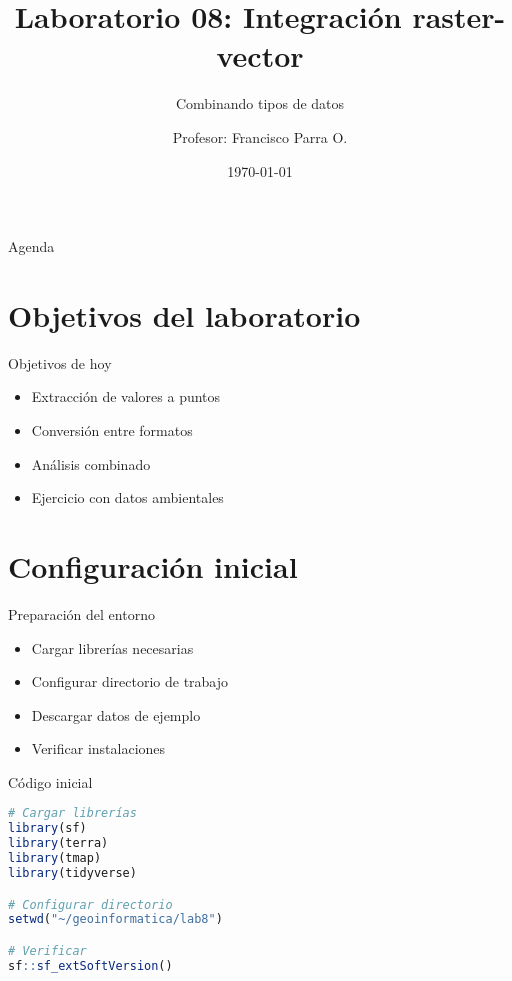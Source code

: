 \documentclass[10pt]{beamer}
\title{Laboratorio 08: Integración raster-vector}
\subtitle{Combinando tipos de datos}
\author{Profesor: Francisco Parra O.}
\institute{USACH - Ingeniería Civil en Informática}
\date{\today}
\begin{document}
\maketitle

\begin{frame}{Agenda}
    \tableofcontents
\end{frame}


\section{Objetivos del laboratorio}

\begin{frame}{Objetivos de hoy}
    \begin{itemize}
        \item Extracción de valores a puntos
        \item Conversión entre formatos
        \item Análisis combinado
        \item Ejercicio con datos ambientales
    \end{itemize}
\end{frame}

\section{Configuración inicial}

\begin{frame}{Preparación del entorno}
    \begin{itemize}
        \item Cargar librerías necesarias
        \item Configurar directorio de trabajo
        \item Descargar datos de ejemplo
        \item Verificar instalaciones
    \end{itemize}
\end{frame}

\begin{frame}[fragile]{Código inicial}
    \begin{lstlisting}[language=R]
# Cargar librerías
library(sf)
library(terra)
library(tmap)
library(tidyverse)

# Configurar directorio
setwd("~/geoinformatica/lab8")

# Verificar
sf::sf_extSoftVersion()
    \end{lstlisting}
\end{frame}
\end{document}
